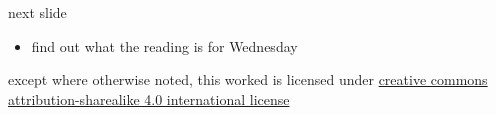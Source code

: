\documentclass[10pt,t,usenames,dvipsnames]{beamer}
\begin{document}
  \ifnotes\else
  \begin{frame}{next slide}
    \begin{itemize}
      \item find out what the reading is for Wednesday
    \end{itemize}
  \end{frame}
  \fi

  \begin{frame}[c]
    \begin{center}\ccbysa\end{center}

    except where otherwise noted, this worked is licensed under
    \href{http://creativecommons.org/licenses/by-sa/4.0/}{creative commons
    attribution-sharealike 4.0 international license}
  \end{frame}
\end{document}
